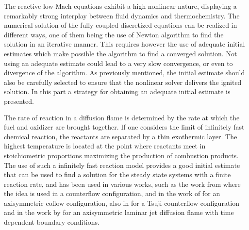 The reactive low-Mach equations exhibit a high nonlinear nature, displaying a remarkably strong interplay between fluid dynamics and thermochemistry. The numerical solution of the fully coupled discretized equations can be realized in different ways, one of them being the use of Newton algorithm to find the solution in an iterative manner. This requires however the use of adequate initial estimates which make possible the algorithm to find a converged solution. Not using an adequate estimate could lead to a very slow convergence, or even to divergence of the algorithm. As previously mentioned, the initial estimate should also be carefully selected to ensure that the nonlinear solver delivers the ignited solution. In this part a strategy for obtaining an adequate initial estimate is presented.

The rate of reaction in a diffusion flame is determined by the rate at which the fuel and oxidizer are brought together. If one considers the limit of infinitely fast chemical reaction, the reactants are separated by a thin exothermic layer. The highest temperature is located at the point where reactants meet in stoichiometric proportions maximizing the production of combustion products. The use of such a infinitely fast reaction model provides a good initial estimate that can be used to find a solution for the steady state systems with a finite reaction rate, and has been used in various works, such as the work from \textcite{keyesFlameSheetStarting1987} where the idea is used in a counterflow configuration, and in the work of \textcite{smookeNumericalSolutionTwoDimensional1986} for an axisymmetric coflow configuration, 
also in \textcite{smookeNumericalModelingAxisymmetric1992} for a Tsuji-counterflow configuration and in the work by  \textcite{dobbinsFullyImplicitCompact2010} for an axisymmetric laminar jet diffusion flame with time dependent boundary conditions.


